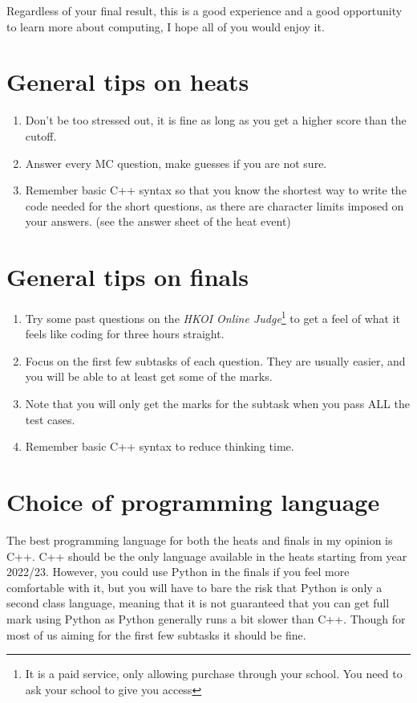Regardless of your final result, this is a good experience and a good opportunity to learn more about computing, I hope all of you would enjoy it.

\section{General tips on heats}
\begin{enumerate}
    \item Don't be too stressed out, it is fine as long as you get a higher score than the cutoff.
    \item Answer every MC question, make guesses if you are not sure.
    \item Remember basic C++ syntax so that you know the shortest way to write the code needed for the short questions, as there are character limits imposed on your answers. (see the answer sheet of the heat event)
\end{enumerate}

\section{General tips on finals}
\begin{enumerate}
    \item Try some past questions on the \textit{HKOI Online Judge}\footnote{It is a paid service, only allowing purchase through your school. You need to ask your school to give you access} to get a feel of what it feels like coding for three hours straight.
    \item Focus on the first few subtasks of each question. They are usually easier, and you will be able to at least get some of the marks.
    \item Note that you will only get the marks for the subtask when you pass ALL the test cases.
    \item Remember basic C++ syntax to reduce thinking time.
\end{enumerate}

\section{Choice of programming language}

The best programming language for both the heats and finals in my opinion is C++. C++ should be the only language available in the heats starting from year 2022/23. However, you could use Python in the finals if you feel more comfortable with it, but you will have to bare the risk that Python is only a second class language, meaning that it is not guaranteed that you can get full mark using Python as Python generally runs a bit slower than C++. Though for most of us aiming for the first few subtasks it should be fine.